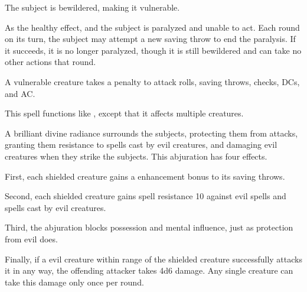 \spellrng{\rngclose}
\begin{spellhealthy}
  The subject is bewildered, making it vulnerable.
\end{spellhealthy}
\begin{spellblood}
  As the healthy effect, and the subject is paralyzed and unable to act. Each round on its turn, the subject may attempt a new saving throw to end the paralysis. If it succeeds, it is no longer paralyzed, though it is still bewildered and can take no other actions that round.
\end{spellblood}
\begin{spellnotes}
  A vulnerable creature takes a  penalty to attack rolls, saving throws, checks, DCs, and AC.
\end{spellnotes}

\spellrng{\rngmed}
\begin{spelleffect}
  This spell functions like , except that it affects multiple creatures.
\end{spelleffect}

\begin{spelleffect}
  A brilliant divine radiance surrounds the subjects, protecting them from attacks, granting them resistance to spells cast by evil creatures, and damaging evil creatures when they strike the subjects. This abjuration has four effects.
  \par First, each shielded creature gains a  enhancement bonus to its saving throws.
  \par Second, each shielded creature gains spell resistance 10 against evil spells and spells cast by evil creatures.
  \par Third, the abjuration blocks possession and mental influence, just as protection from evil does.
  \par Finally, if a evil creature within \rngmed range of the shielded creature successfully attacks it in any way, the offending attacker takes 4d6 damage. Any single creature can take this damage only once per round.
\end{spelleffect}

